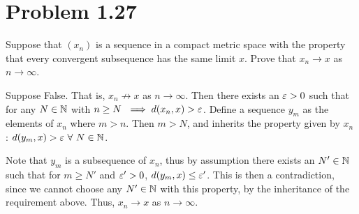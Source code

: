 \newpage
\section{Problem 1.27}
Suppose that $(x_n)$ is a sequence in a compact metric space with the property that every convergent subsequence has the same limit $x$. Prove that $x_n \rightarrow x$ as $n \rightarrow \infty$.
\partbreak
\begin{solution}

    Suppose False. That is, $x_n \not \rightarrow x$ as $n \rightarrow \infty$. Then there exists an $\varepsilon > 0$ such that for any $N \in \mathbb{N}$ with $n \geq N \ \implies d(x_n, x) > \varepsilon$. Define a sequence $y_m$ as the elements of $x_n$ where $m > n$. Then $m > N$, and inherits the property given by $x_n$ : $d(y_m, x) > \varepsilon \ \forall \ N \in \mathbb{N}$. \par

    \jump
    Note that $y_m$ is a subsequence of $x_n$, thus by assumption there exists an $N' \in \mathbb{N}$ such that for $m \geq N'$ and $\varepsilon' > 0$, $d(y_m, x) \leq \varepsilon'$. This is then a contradiction, since we cannot choose any $N' \in \mathbb{N}$ with this property, by the inheritance of the requirement above. Thus, $x_n \rightarrow x$ as $n \rightarrow \infty$. 
\end{solution}
